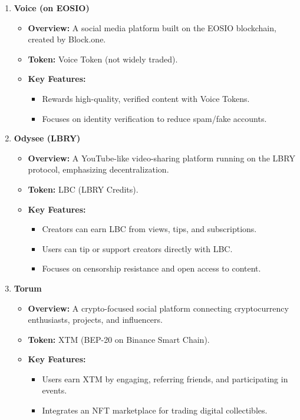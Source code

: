 \documentclass{article}
\begin{document}
\begin{itemize}
\begin{enumerate}
        \item \textbf{Voice (on EOSIO)}
          \begin{itemize}
            \item \textbf{Overview:} A social media platform built on the EOSIO blockchain, created by Block.one.
            \item \textbf{Token:} Voice Token (not widely traded).
            \item \textbf{Key Features:}
              \begin{itemize}
                \item Rewards high-quality, verified content with Voice Tokens.
                \item Focuses on identity verification to reduce spam/fake accounts.
              \end{itemize}
          \end{itemize}

        \item \textbf{Odysee (LBRY)}
          \begin{itemize}
            \item \textbf{Overview:} A YouTube-like video-sharing platform running on the LBRY protocol, emphasizing decentralization.
            \item \textbf{Token:} LBC (LBRY Credits).
            \item \textbf{Key Features:}
              \begin{itemize}
                \item Creators can earn LBC from views, tips, and subscriptions.
                \item Users can tip or support creators directly with LBC.
                \item Focuses on censorship resistance and open access to content.
              \end{itemize}
          \end{itemize}

        \item \textbf{Torum}
          \begin{itemize}
            \item \textbf{Overview:} A crypto-focused social platform connecting cryptocurrency enthusiasts, projects, and influencers.
            \item \textbf{Token:} XTM (BEP-20 on Binance Smart Chain).
            \item \textbf{Key Features:}
              \begin{itemize}
                \item Users earn XTM by engaging, referring friends, and participating in events.
                \item Integrates an NFT marketplace for trading digital collectibles.
              \end{itemize}
          \end{itemize}


\end{enumerate}
\end{itemize}
\end{document}
